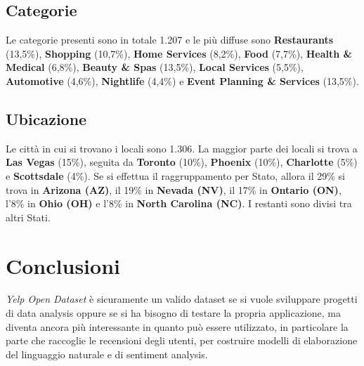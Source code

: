 \documentclass[12pt]{article}
\begin{document}
\subsection{Categorie}
Le categorie presenti sono in totale 1.207 e le più diffuse sono \textbf{Restaurants} (13,5\%), \textbf{Shopping} (10,7\%), \textbf{Home Services} (8,2\%), \textbf{Food} (7,7\%), \textbf{Health \& Medical} (6,8\%), \textbf{Beauty \& Spas} (13,5\%), \textbf{Local Services} (5,5\%), \textbf{Automotive} (4,6\%), \textbf{Nightlife} (4,4\%) e \textbf{Event Planning \& Services} (13,5\%).

\subsection{Ubicazione}
Le città in cui si trovano i locali sono 1.306. La maggior parte dei locali si trova a \textbf{Las Vegas} (15\%), seguita da \textbf{Toronto} (10\%), \textbf{Phoenix} (10\%), \textbf{Charlotte} (5\%) e \textbf{Scottsdale} (4\%).\newline
Se si effettua il raggruppamento per Stato, allora il 29\% si trova in \textbf{Arizona (AZ)}, il 19\% in \textbf{Nevada (NV)}, il 17\% in \textbf{Ontario (ON)}, l'8\% in \textbf{Ohio (OH)} e l'8\% in \textbf{North Carolina (NC)}. I restanti sono divisi tra altri Stati.

\section{Conclusioni}
\textit{Yelp Open Dataset} è sicuramente un valido dataset se si vuole sviluppare progetti di data analysis oppure se si ha bisogno di testare la propria applicazione, ma diventa ancora più interessante in quanto può essere utilizzato, in particolare la parte che raccoglie le recensioni degli utenti, per costruire modelli di elaborazione del linguaggio naturale e di sentiment analysis.

\printbibliography[title={Riferimenti}]
\end{document}
